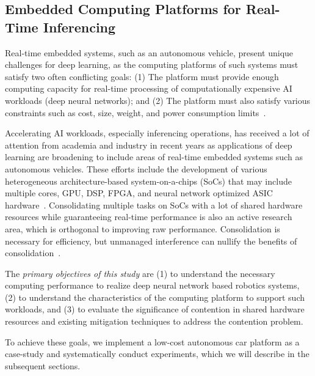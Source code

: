 \subsection{Embedded Computing Platforms for Real-Time Inferencing}
Real-time embedded systems, such as an autonomous vehicle, present
unique challenges for deep learning, as the computing platforms of such
systems must satisfy two often conflicting goals:
(1) The platform must provide 
enough computing capacity for real-time processing of computationally
expensive AI workloads (deep neural networks); and
(2) The platform must also satisfy various
constraints such as cost, size, weight, and power consumption limits~\cite{Otterness2017}.

Accelerating AI workloads, especially inferencing
operations, has received a lot of attention from academia and industry
in recent years as applications of deep learning are broadening to include
areas of real-time embedded systems such as autonomous vehicles. These
efforts include the development of various heterogeneous architecture-based 
system-on-a-chips (SoCs) that may include multiple cores, GPU,
DSP, FPGA, and neural network optimized ASIC hardware~\cite{Jouppi2017}.
Consolidating multiple tasks on SoCs with a lot of shared hardware
resources while guaranteeing real-time performance is also an active
research area, which is orthogonal to improving raw
performance. Consolidation is necessary for efficiency, but unmanaged 
interference can nullify the benefits of consolidation~\cite{Kim2016}.

The \emph{primary objectives of this study} are (1) to understand the
necessary computing performance to realize deep neural network based
robotics systems, (2) to understand the characteristics of the
computing platform to support such workloads, and (3) to evaluate the
significance of contention in shared hardware resources and existing
mitigation techniques to address the contention problem.

To achieve these goals, we implement a low-cost autonomous car platform
as a case-study and systematically conduct experiments, which we will 
describe in the subsequent sections.

